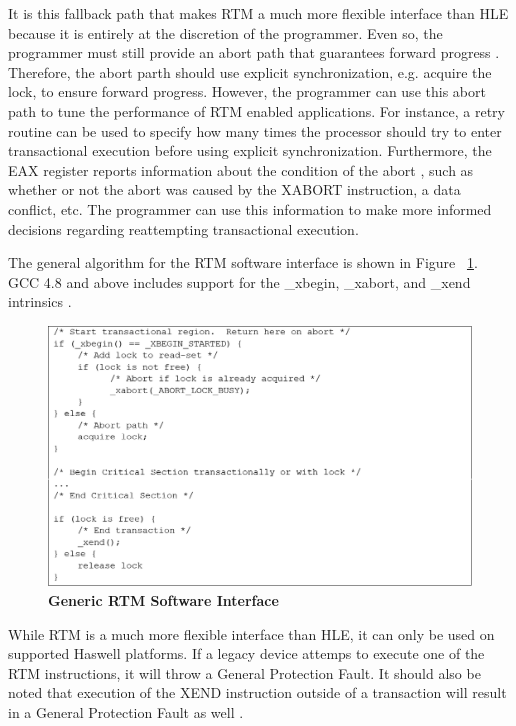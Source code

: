 \documentclass[a4paper]{article}
\begin{document}
\indent It is this fallback path that makes RTM a much more flexible interface
than HLE because it is entirely at the discretion of the programmer.  Even so,
the programmer must still provide an abort path that guarantees forward progress
\cite{intel_prog_ref}.  Therefore, the abort parth should use explicit
synchronization, e.g. acquire the lock, to ensure forward progress. However, the
programmer can use this abort path to tune the performance of RTM enabled
applications.  For instance, a retry routine can be used to specify how many
times the processor should try to enter transactional execution before using
explicit synchronization.  Furthermore, the EAX register reports information
about the condition of the abort \cite{intel_prog_ref}, such as whether or not
the abort was caused by the XABORT instruction, a data conflict, etc.  The
programmer can use this information to make more informed decisions regarding
reattempting transactional execution.\par


\indent The general algorithm for the RTM software interface is shown in Figure
~\ref{fig:rtm_interface}.  GCC 4.8 and above includes support for the \_xbegin,
\_xabort, and \_xend intrinsics \cite{gcc}.

\begin{figure}[H]
    \centering
    \graphicspath{ {./figures/} }
    \includegraphics[width=\textwidth,height=\textheight,keepaspectratio]{fig_rtmInterface}
    \caption{\textbf{Generic RTM Software Interface}}
    \label{fig:rtm_interface}
\end{figure}

\indent While RTM is a much more flexible interface than HLE, it can only be
used on supported Haswell platforms.  If a legacy device attemps to execute one
of the RTM instructions, it will throw a General Protection Fault.  It should
also be noted that execution of the XEND instruction outside of a transaction
will result in a General Protection Fault as well \cite{intel_opt_man}.
\end{document}
